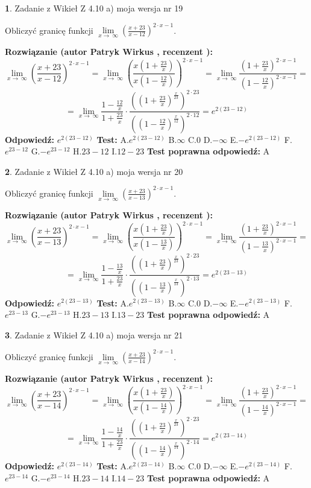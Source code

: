 \documentclass[12pt, a4paper]{article}
\theoremstyle{definition} %
\newtheorem{zad}{}
\newcommand{\zadStart}[1]{\begin{zad}#1\newline}
\newcommand{\zadStop}{\end{zad}}
\newcommand{\rozwStart}[2]{\noindent \textbf{Rozwiązanie (autor #1 , recenzent #2): }\newline}
\newcommand{\rozwStop}{\newline}
\newcommand{\odpStart}{\noindent \textbf{Odpowiedź:}\newline}
\newcommand{\odpStop}{\newline}
\newcommand{\testStart}{\noindent \textbf{Test:}\newline}
\newcommand{\testStop}{\newline}
\newcommand{\kluczStart}{\noindent \textbf{Test poprawna odpowiedź:}\newline}
\newcommand{\kluczStop}{\newline}
\begin{document}
\zadStart{Zadanie z Wikieł Z 4.10 a) moja wersja nr 19}


Obliczyć granicę funkcji  $\lim\limits_{x\to\ \infty}(\frac{x+23}{x-12})^{2\cdot x-1}$.
\zadStop
\rozwStart{Patryk Wirkus}{}
$$\lim\limits_{x\to\ \infty}(\frac{x+23}{x-12})^{2\cdot x-1} = \lim\limits_{x\to\ \infty}(\frac{x(1+\frac{23}{x})}{x(1-\frac{12}{x})})^{2\cdot x-1}=\lim\limits_{x\to\ \infty}\frac{(1+\frac{23}{x})^{2\cdot x-1}}{(1-\frac{12}{x})^{2\cdot x-1}}=$$
$$=\lim\limits_{x\to\ \infty}\frac{1-\frac{12}{x}}{1+\frac{23}{x}}\cdot\frac{((1+\frac{23}{x})^{\frac{x}{23}})^{2\cdot23}}{((1-\frac{12}{x})^{\frac{x}{12}})^{2\cdot12}}=e^{2(23-12)}$$
\rozwStop
\odpStart
$e^{2(23-12)}$
\odpStop
\testStart
A.$e^{2(23-12)}$ B.$\infty$ C.$0$ D.$-\infty$ E.$-e^{2(23-12)}$
F.$e^{23-12}$ G.$-e^{23-12}$
H.$23-12$
I.$12-23$
\testStop
\kluczStart
A
\kluczStop



\zadStart{Zadanie z Wikieł Z 4.10 a) moja wersja nr 20}


Obliczyć granicę funkcji  $\lim\limits_{x\to\ \infty}(\frac{x+23}{x-13})^{2\cdot x-1}$.
\zadStop
\rozwStart{Patryk Wirkus}{}
$$\lim\limits_{x\to\ \infty}(\frac{x+23}{x-13})^{2\cdot x-1} = \lim\limits_{x\to\ \infty}(\frac{x(1+\frac{23}{x})}{x(1-\frac{13}{x})})^{2\cdot x-1}=\lim\limits_{x\to\ \infty}\frac{(1+\frac{23}{x})^{2\cdot x-1}}{(1-\frac{13}{x})^{2\cdot x-1}}=$$
$$=\lim\limits_{x\to\ \infty}\frac{1-\frac{13}{x}}{1+\frac{23}{x}}\cdot\frac{((1+\frac{23}{x})^{\frac{x}{23}})^{2\cdot23}}{((1-\frac{13}{x})^{\frac{x}{13}})^{2\cdot13}}=e^{2(23-13)}$$
\rozwStop
\odpStart
$e^{2(23-13)}$
\odpStop
\testStart
A.$e^{2(23-13)}$ B.$\infty$ C.$0$ D.$-\infty$ E.$-e^{2(23-13)}$
F.$e^{23-13}$ G.$-e^{23-13}$
H.$23-13$
I.$13-23$
\testStop
\kluczStart
A
\kluczStop



\zadStart{Zadanie z Wikieł Z 4.10 a) moja wersja nr 21}


Obliczyć granicę funkcji  $\lim\limits_{x\to\ \infty}(\frac{x+23}{x-14})^{2\cdot x-1}$.
\zadStop
\rozwStart{Patryk Wirkus}{}
$$\lim\limits_{x\to\ \infty}(\frac{x+23}{x-14})^{2\cdot x-1} = \lim\limits_{x\to\ \infty}(\frac{x(1+\frac{23}{x})}{x(1-\frac{14}{x})})^{2\cdot x-1}=\lim\limits_{x\to\ \infty}\frac{(1+\frac{23}{x})^{2\cdot x-1}}{(1-\frac{14}{x})^{2\cdot x-1}}=$$
$$=\lim\limits_{x\to\ \infty}\frac{1-\frac{14}{x}}{1+\frac{23}{x}}\cdot\frac{((1+\frac{23}{x})^{\frac{x}{23}})^{2\cdot23}}{((1-\frac{14}{x})^{\frac{x}{14}})^{2\cdot14}}=e^{2(23-14)}$$
\rozwStop
\odpStart
$e^{2(23-14)}$
\odpStop
\testStart
A.$e^{2(23-14)}$ B.$\infty$ C.$0$ D.$-\infty$ E.$-e^{2(23-14)}$
F.$e^{23-14}$ G.$-e^{23-14}$
H.$23-14$
I.$14-23$
\testStop
\kluczStart
A
\kluczStop
\end{document}
